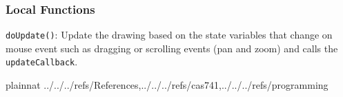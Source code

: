 \documentclass[12pt, titlepage]{article}
\newcommand{\code}[1]{\texttt{#1}}
\begin{document}
\subsubsection{Local Functions}
\code{doUpdate()}: Update the drawing based on the state variables that change on mouse event
  such as dragging or scrolling events (pan and zoom) and calls the \code{updateCallback}.

\newpage






 {plainnat}
 {../../../refs/References,../../../refs/cas741,../../../refs/programming}

\newpage
\end{document}
